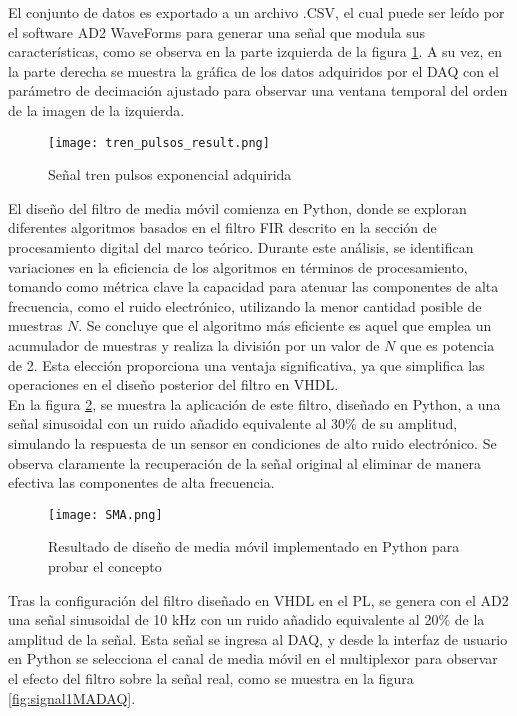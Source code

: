 \documentclass{report}
\begin{document}
\noindent El conjunto de datos es exportado a un archivo .CSV, el cual puede ser leído por el software AD2 WaveForms para generar una señal que modula sus características, como se observa en la parte izquierda de la figura \ref{fig:trenDAQ}. A su vez, en la parte derecha se muestra la gráfica de los datos adquiridos por el DAQ con el parámetro de decimación ajustado para observar una ventana temporal del orden de la imagen de la izquierda.

\begin{figure}[H]
    \centering
    \texttt{[image: tren\_pulsos\_result.png]}
    \caption{Señal tren pulsos exponencial adquirida}
    \label{fig:trenDAQ}
\end{figure}

\noindent  El diseño del filtro de media móvil comienza en Python, donde se exploran diferentes algoritmos basados en el filtro FIR descrito en la sección de procesamiento digital del marco teórico. Durante este análisis, se identifican variaciones en la eficiencia de los algoritmos en términos de procesamiento, tomando como métrica clave la capacidad para atenuar las componentes de alta frecuencia, como el ruido electrónico, utilizando la menor cantidad posible de muestras $N$. Se concluye que el algoritmo más eficiente es aquel que emplea un acumulador de muestras y realiza la división por un valor de $N$ que es potencia de 2. Esta elección proporciona una ventaja significativa, ya que simplifica las operaciones en el diseño posterior del filtro en VHDL.\\

\noindent En la figura \ref{fig:SMA}, se muestra la aplicación de este filtro, diseñado en Python, a una señal sinusoidal con un ruido añadido equivalente al 30\% de su amplitud, simulando la respuesta de un sensor en condiciones de alto ruido electrónico. Se observa claramente la recuperación de la señal original al eliminar de manera efectiva las componentes de alta frecuencia.

\begin{figure}[H]
    \centering
    \texttt{[image: SMA.png]}
    \caption{Resultado de diseño de media móvil implementado en Python para probar el concepto}
    \label{fig:SMA}

\end{figure}

\noindent Tras la configuración del filtro diseñado en VHDL en el PL, se genera con el AD2 una señal sinusoidal de 10 kHz con un ruido añadido equivalente al 20\% de la amplitud de la señal. Esta señal se ingresa al DAQ, y desde la interfaz de usuario en Python se selecciona el canal de media móvil en el multiplexor para observar el efecto del filtro sobre la señal real, como se muestra en la figura \ref{fig:signal1MADAQ}.
\end{document}
